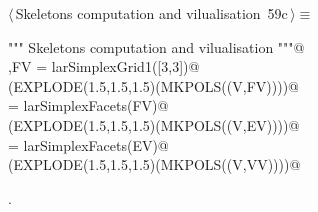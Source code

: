 \documentclass[11pt,oneside]{article}    %
\begin{document}
\begin{flushleft} \small \label{scrap110}
\protect{}$\langle\,$Skeletons computation and vilualisation\nobreak\ {\footnotesize 59c}$\,\rangle\equiv$
\vspace{-1ex}
\begin{list}{}{} \item
\mbox{}\verb@""" Skeletons computation and vilualisation """@\\
\mbox{}\verb@V,FV = larSimplexGrid1([3,3])@\\
\mbox{}\verb@VIEW(EXPLODE(1.5,1.5,1.5)(MKPOLS((V,FV))))@\\
\mbox{}\verb@EV = larSimplexFacets(FV)@\\
\mbox{}\verb@VIEW(EXPLODE(1.5,1.5,1.5)(MKPOLS((V,EV))))@\\
\mbox{}\verb@VV = larSimplexFacets(EV)@\\
\mbox{}\verb@VIEW(EXPLODE(1.5,1.5,1.5)(MKPOLS((V,VV))))@\\
\mbox{}\verb@@{\NWsep}
\end{list}
\vspace{-1ex}
\footnotesize\addtolength{\baselineskip}{-1ex}
\begin{list}{}{\setlength{\itemsep}{-\parsep}\setlength{\itemindent}{-\leftmargin}}
\item {\NWtxtMacroNoRef}.
\end{list}
\end{flushleft}
\end{document}
